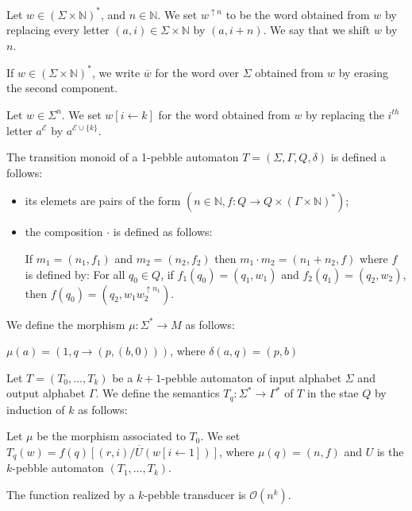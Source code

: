 \begin{definition}
Let $w\in (\Sigma\times \mathbb{N})^*$, and $n\in \mathbb{N}$.
 We set $w^{\uparrow n}$ to be the word obtained from $w$ by replacing every letter $(a,i)\in \Sigma\times \mathbb{N}$ by $(a,i+n)$. We say that we shift $w$ by $n$. 

If $w\in (\Sigma\times \mathbb{N})^*$, we write $\overline{w}$ for the word over $\Sigma$ obtained from $w$ by erasing the second component.

Let $w\in \Sigma^n$. We set $w[i\leftarrow k]$ for the word obtained from $w$ by replacing the $i^{th}$ letter $a^\mathcal{E}$ by $a^{\mathcal{E} \cup\{k\}}$.
\end{definition}

\begin{definition}
The transition monoid of a 1-pebble automaton $T=(\Sigma,\Gamma,Q, \delta)$ is defined a follows:
\begin{itemize}
\item its elemets are pairs of the form $(n\in\mathbb{N}, f:Q\to Q\times(\Gamma\times\mathbb{N})^*)$;
\item the composition $\cdot$ is defined as follows:

If $m_1=(n_1,f_1)$  and $m_2=(n_2, f_2)$ then  $m_1\cdot m_2=(n_1+n_2, f)$ where $f$ is defined by:
For all $q_0\in Q$, if $f_1(q_0)=(q_1, w_1)$ and $f_2(q_1)=(q_2, w_2)$, then $f(q_0)=(q_2, w_1w_2^{\uparrow n_1})$.
\end{itemize} 
We define the morphism $\mu:\Sigma^*\to M$ as follows:

$\mu(a)=(1, q\to (p, (b,0)))$, where $\delta(a,q)=(p, b)$
\end{definition}

\begin{definition}
Let $T=(T_0,\dots,T_k)$ be a $k+1$-pebble automaton of input alphabet $\Sigma$ and output alphabet $\Gamma$. We define the semantics $T_q:\Sigma^*\to \Gamma^*$ of $T$ in the stae $Q$ by induction of $k$ as follows:

Let $\mu$ be the morphism associated to $T_0$.
We set $T_q(w)=\overline{f(q)[(r,i)/U(w[i\leftarrow 1])]}$, where $\mu(q)=(n,f)$ and $U$ is the $k$-pebble automaton $(T_1,\dots, T_k)$. 

 \end{definition}


\begin{proposition}[\cite{}]
The function realized by a $k$-pebble transducer is $\mathcal{O}(n^k)$.
\end{proposition}